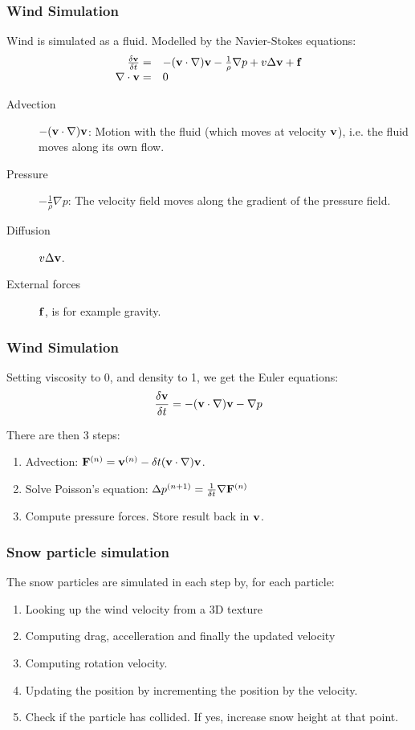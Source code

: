 \begin{frame}
\frametitle{Wind Simulation}
Wind is simulated as a fluid. Modelled by the Navier-Stokes equations:
$$
\begin{array}{rl}
\frac{\delta {\bf v}}{\delta t} = & -({\bf v}\cdot \nabla){\bf v}-\frac{1}{\rho}\nabla p + v\Delta {\bf v} + {\bf f}\\
\nabla\cdot {\bf v} = & 0
\end{array}
$$

\begin{description}
\item[Advection] $-({\bf v}\cdot \nabla){\bf v}$: Motion with the fluid (which moves at velocity ${\bf v}$), i.e. the fluid moves along its own flow.
\item[Pressure] $-\frac{1}{\rho}\nabla p$: The velocity field moves along the gradient of the pressure field.
\item[Diffusion] $v\Delta {\bf v}$.
\item[External forces] ${\bf f}$, is for example gravity.
\end{description}
\end{frame}

\begin{frame}
\frametitle{Wind Simulation}
Setting viscosity to 0, and density to 1, we get the Euler equations:
$$
\frac{\delta {\bf v}}{\delta t} = -({\bf v}\cdot \nabla){\bf v}-\nabla p 
$$

There are then 3 steps:
\begin{enumerate}
\item Advection: ${\bf F}^{(n)} = {\bf v}^{(n)} - \delta t({\bf v} \cdot \nabla){\bf v}$.
\item Solve Poisson's equation: $\Delta p^{(n+1)} = \frac{1}{\delta t}\nabla {\bf F}^{(n)}$
\item Compute pressure forces. Store result back in ${\bf v}$.
\end{enumerate}
\end{frame}

\begin{frame}
\frametitle{Snow particle simulation}
The snow particles are simulated in each step by, for each particle:
\begin{enumerate}
\item Looking up the wind velocity from a 3D texture
\item Computing drag, accelleration and finally the updated velocity
\item Computing rotation velocity.
\item Updating the position by incrementing the position by the velocity.
\item Check if the particle has collided. If yes, increase snow height at that point.
\end{enumerate}
\end{frame}

